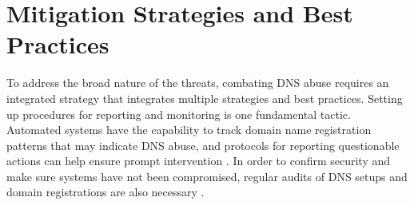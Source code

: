 \section{Mitigation Strategies and Best Practices }

To address the broad nature of the threats, combating DNS abuse requires an integrated strategy that integrates multiple strategies and best practices. Setting up procedures for reporting and monitoring is one fundamental tactic. Automated systems have the capability to track domain name registration patterns that may indicate DNS abuse, and protocols for reporting questionable actions can help ensure prompt intervention \cite{icannndnssec} . In order to confirm security and make sure systems have not been compromised, regular audits of DNS setups and domain registrations are also necessary \cite{lucas2021tls} .

